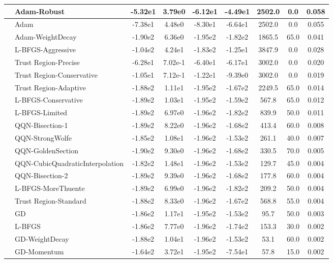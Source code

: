 \documentclass{article}
\begin{document}
\begin{longtable}{|l|l|c|c|c|c|c|c|c|}
\hline
 & Adam-Robust & -5.32e1 & 3.79e0 & -6.12e1 & -4.49e1 & 2502.0 & 0.0 & 0.058 \\
\hline
 & Adam & -7.38e1 & 4.48e0 & -8.30e1 & -6.64e1 & 2502.0 & 0.0 & 0.055 \\
\hline
 & Adam-WeightDecay & -1.90e2 & 6.36e0 & -1.95e2 & -1.82e2 & 1865.5 & 65.0 & 0.041 \\
\hline
 & L-BFGS-Aggressive & -1.04e2 & 4.24e1 & -1.83e2 & -1.25e1 & 3847.9 & 0.0 & 0.028 \\
\hline
 & Trust Region-Precise & -6.28e1 & 7.02e-1 & -6.40e1 & -6.17e1 & 3002.0 & 0.0 & 0.020 \\
\hline
 & Trust Region-Conservative & -1.05e1 & 7.12e-1 & -1.22e1 & -9.39e0 & 3002.0 & 0.0 & 0.019 \\
\hline
 & Trust Region-Adaptive & -1.88e2 & 1.11e1 & -1.95e2 & -1.67e2 & 2249.5 & 65.0 & 0.014 \\
\hline
 & L-BFGS-Conservative & -1.89e2 & 1.03e1 & -1.95e2 & -1.59e2 & 567.8 & 65.0 & 0.012 \\
\hline
 & L-BFGS-Limited & -1.89e2 & 6.97e0 & -1.96e2 & -1.82e2 & 839.9 & 50.0 & 0.011 \\
\hline
 & QQN-Bisection-1 & -1.89e2 & 8.22e0 & -1.96e2 & -1.68e2 & 413.4 & 60.0 & 0.008 \\
\hline
 & QQN-StrongWolfe & -1.85e2 & 1.08e1 & -1.96e2 & -1.53e2 & 261.1 & 40.0 & 0.007 \\
\hline
 & QQN-GoldenSection & -1.90e2 & 9.30e0 & -1.96e2 & -1.68e2 & 330.5 & 70.0 & 0.005 \\
\hline
 & QQN-CubicQuadraticInterpolation & -1.82e2 & 1.48e1 & -1.96e2 & -1.53e2 & 129.7 & 45.0 & 0.004 \\
\hline
 & QQN-Bisection-2 & -1.89e2 & 9.39e0 & -1.96e2 & -1.68e2 & 177.8 & 60.0 & 0.004 \\
\hline
 & L-BFGS-MoreThuente & -1.89e2 & 6.99e0 & -1.96e2 & -1.82e2 & 209.2 & 50.0 & 0.004 \\
\hline
 & Trust Region-Standard & -1.88e2 & 8.33e0 & -1.96e2 & -1.67e2 & 568.8 & 55.0 & 0.004 \\
\hline
 & GD & -1.86e2 & 1.17e1 & -1.95e2 & -1.53e2 & 95.7 & 50.0 & 0.003 \\
\hline
 & L-BFGS & -1.86e2 & 7.77e0 & -1.96e2 & -1.74e2 & 153.3 & 30.0 & 0.002 \\
\hline
 & GD-WeightDecay & -1.88e2 & 1.04e1 & -1.96e2 & -1.53e2 & 53.1 & 60.0 & 0.002 \\
\hline
 & GD-Momentum & -1.64e2 & 3.72e1 & -1.95e2 & -7.54e1 & 57.8 & 15.0 & 0.002 \\

\end{longtable}
\end{document}
